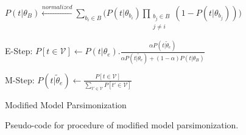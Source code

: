 \begin{figure}[!t]
\centering
\begin{algorithm}[H]
 \begin{algorithmic}[1]
     \State \begin{small}$P(t|\theta_B) \xleftarrow{normalized} \sum_{b_i\in B} \bigg(P(t|\theta_{b_i}) \prod_{\substack{b_j\in B \\ j \neq i}} (1-P(t|\theta_{b_j}))\bigg)$ \end{small}
     \Repeat
         \State \begin{small}E-Step: $P[t\in \mathcal{V}] \gets P(t|\theta_e).\frac{\alpha P(t|\tilde{\theta}_e)}{\alpha P(t|\tilde{\theta}_e) + (1-\alpha) P(t|\theta_B)}$ \end{small}
          \State \begin{small}M-Step: $P(t|\tilde{\theta}_e) \gets \frac{ P[t \in \mathcal{V}]}{\sum_{t' \in \mathcal{V}} P[t' \in \mathcal{V}]}$ \end{small}
 \EndFor
 \EndProcedure
 \end{algorithmic}
 \caption{Modified Model Parsimonization}
\end{algorithm}
\caption{Pseudo-code for procedure of modified model parsimonization.}
\end{figure}